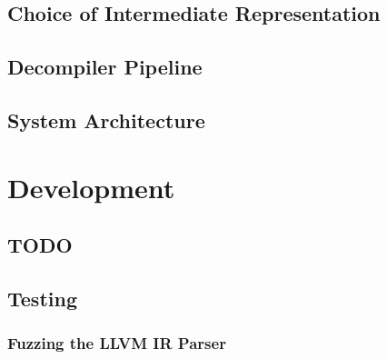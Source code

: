 \documentclass[12pt, a4paper]{article}
\begin{document}

\subsection{Choice of Intermediate Representation}


\subsection{Decompiler Pipeline}


\subsection{System Architecture}



\section{Development}


\subsection{TODO}


\subsection{Testing}


\subsubsection{Fuzzing the LLVM IR Parser}

\end{document}
